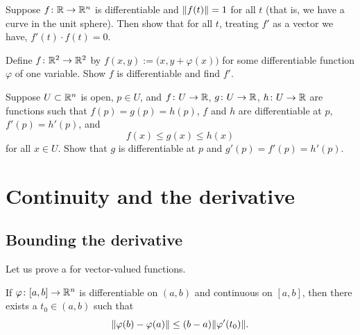 \begin{exercise}
Suppose $f \colon {\mathbb{R}} \to {\mathbb{R}}^n$ is differentiable and $\lVert {f(t)} \rVert = 1$ for
all $t$ (that is, we have a curve in the unit sphere).  Then show that for
all $t$, treating $f'$ as a vector we have, $f'(t) \cdot f(t) = 0$.
\end{exercise}

\begin{exercise}
Define $f \colon {\mathbb{R}}^2 \to {\mathbb{R}}^2$ by $f(x,y) :=
\bigl(x,y+\varphi(x)\bigr)$ for some differentiable function $\varphi$ of one
variable.  Show $f$ is differentiable and find $f'$.
\end{exercise}

\begin{exercise}
Suppose $U \subset {\mathbb{R}}^n$ is open, $p \in U$, and
$f \colon U \to {\mathbb{R}}$,
$g \colon U \to {\mathbb{R}}$,
$h \colon U \to {\mathbb{R}}$ are functions such that
$f(p) = g(p) = h(p)$, $f$ and $h$ are differentiable at $p$,
$f'(p) = h'(p)$, and
\begin{equation*}
f(x) \leq g(x) \leq h(x)
\end{equation*}
for all $x \in U$.  Show that $g$ is differentiable at $p$ and 
$g'(p) = f'(p) = h'(p)$.
\end{exercise}


\sectionnewpage
\section{Continuity and the derivative}
\label{sec:svthedercont}


\subsection{Bounding the derivative}

Let us prove a  for vector-valued functions.

\begin{lemma}
If $\varphi \colon [a,b] \to {\mathbb{R}}^n$ is differentiable on $(a,b)$ and
continuous on $[a,b]$, then there exists a $t_0 \in (a,b)$ such that
\begin{equation*}
\lVert {\varphi(b)-\varphi(a)} \rVert \leq (b-a) \lVert {\varphi'(t_0)} \rVert .
\end{equation*}
\end{lemma}

